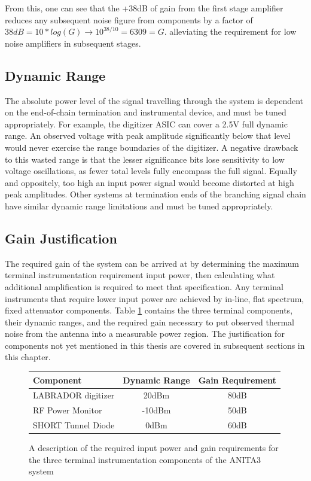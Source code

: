	From this, one can see that the +38dB of gain from the first stage amplifier reduces any subsequent noise figure from components by a factor of $38dB = 10*log(G) \rightarrow 10^{38/10} =  6309 = G$. alleviating the requirement for low noise amplifiers in subsequent stages.


	\subsection{Dynamic Range}
		The absolute power level of the signal travelling through the system is dependent on the end-of-chain termination and instrumental device, and must be tuned appropriately.  For example, the digitizer ASIC can cover a 2.5V full dynamic range.  An observed voltage with peak amplitude significantly below that level would never exercise the range boundaries of the digitizer.  A negative drawback to this wasted range is that the lesser significance bits lose sensitivity to low voltage oscillations, as fewer total levels fully encompass the full signal.  Equally and oppositely, too high an input power signal would become distorted at high peak amplitudes. Other systems at termination ends of the branching signal chain have similar dynamic range limitations and must be tuned appropriately.
		
		
	\subsection{Gain Justification}
		The required gain of the system can be arrived at by determining the maximum terminal instrumentation requirement input power, then calculating what additional amplification is required to meet that specification.  Any terminal instruments that require lower input power are achieved by in-line, flat spectrum, fixed attenuator components.  Table \ref{tab:rfLinkBudget} contains the three terminal components, their dynamic ranges, and the required gain necessary to put observed thermal noise from the antenna into a measurable power region.  The justification for components not yet mentioned in this thesis are covered in subsequent sections in this chapter.
	
\begin{figure}
	\centering
	\begin{tabular}{| l | c | c |}
		\hline
		Component & Dynamic Range & Gain Requirement\\
		\hline
		LABRADOR digitizer & 20dBm & 80dB \\
		RF Power Monitor & -10dBm & 50dB \\
		SHORT Tunnel Diode & 0dBm & 60dB \\
		\hline
	\end{tabular}
	\caption{A description of the required input power and gain requirements for the three terminal instrumentation components of the ANITA3 system}
	\label{tab:rfLinkBudget}
\end{figure}
	
